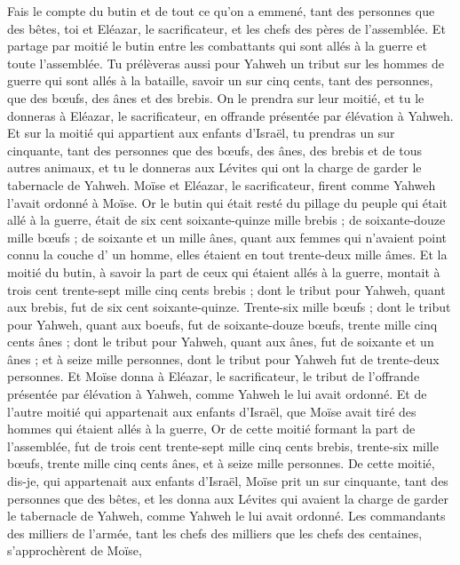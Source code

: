 \begin{multicols}{2}
Fais le compte du butin et de tout ce qu'on a emmené, tant des personnes que des bêtes, toi et Eléazar, le sacrificateur, et les chefs des pères de l'assemblée.
Et partage par moitié le butin entre les combattants qui sont allés à la guerre et toute l'assemblée.
Tu prélèveras aussi pour Yahweh un tribut sur les hommes de guerre qui sont allés à la bataille, savoir un sur cinq cents, tant des personnes, que des bœufs, des ânes et des brebis.
On le prendra sur leur moitié, et tu le donneras à Eléazar, le sacrificateur, en offrande présentée par élévation à Yahweh.
Et sur la moitié qui appartient aux enfants d'Israël, tu prendras un sur cinquante, tant des personnes que des bœufs, des ânes, des brebis et de tous autres animaux, et tu le donneras aux Lévites qui ont la charge de garder le tabernacle de Yahweh.
Moïse et Eléazar, le sacrificateur, firent comme Yahweh l'avait ordonné à Moïse.
Or le butin qui était resté du pillage du peuple qui était allé à la guerre, était de six cent soixante-quinze mille brebis ;
de soixante-douze mille bœufs ;
de soixante et un mille ânes,
quant aux femmes qui n'avaient point connu la couche d' un homme, elles étaient en tout trente-deux mille âmes.
Et la moitié du butin, à savoir la part de ceux qui étaient allés à la guerre, montait à trois cent trente-sept mille cinq cents brebis ;
dont le tribut pour Yahweh, quant aux brebis, fut de six cent soixante-quinze.
Trente-six mille bœufs ; dont le tribut pour Yahweh, quant aux boeufs, fut de soixante-douze bœufs,
trente mille cinq cents ânes ; dont le tribut pour Yahweh, quant aux ânes, fut de soixante et un ânes ;
et à seize mille personnes, dont le tribut pour Yahweh fut de trente-deux personnes.
Et Moïse donna à Eléazar, le sacrificateur, le tribut de l'offrande présentée par élévation à Yahweh, comme Yahweh le lui avait ordonné.
Et de l'autre moitié qui appartenait aux enfants d'Israël, que Moïse avait tiré des hommes qui étaient allés à la guerre,
Or de cette moitié formant la part de l'assemblée, fut de trois cent trente-sept mille cinq cents brebis,
trente-six mille bœufs,
trente mille cinq cents ânes,
et à seize mille personnes.
De cette moitié, dis-je, qui appartenait aux enfants d'Israël, Moïse prit un sur cinquante, tant des personnes que des bêtes, et les donna aux Lévites qui avaient la charge de garder le tabernacle de Yahweh, comme Yahweh le lui avait ordonné.
Les commandants des milliers de l'armée, tant les chefs des milliers que les chefs des centaines, s'approchèrent de Moïse,

\end{multicols}
